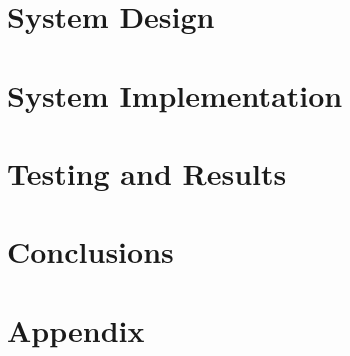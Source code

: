 \documentclass[12pt]{article}
\begin{document}

\newpage

\doublespacing

\tableofcontents %
\newpage

\begin{small} %
\listoffigures %
\end{small}
\newpage 



\newpage


\newpage

\newpage

\section{System Design}

\newpage
\section{System Implementation}



\newpage 
\section{Testing and Results}




\newpage 
\section{Conclusions}

\newpage
\singlespacing
\doublespacing
\newpage

\section{Appendix} %

\newpage

\newpage

\newpage

\newpage


\end{document}
